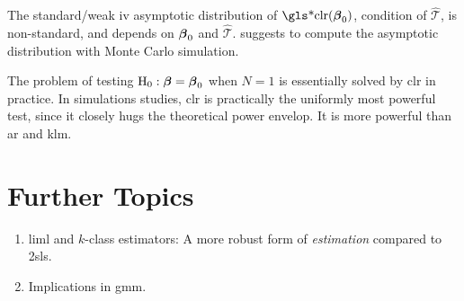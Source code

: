 \documentclass[a4paper]{article}
\begin{document}
\begin{remark}
	The standard/weak \gls*{iv} asymptotic distribution of $\text{\gls*{clr}}(\bbeta_0)$,
	condition of $\hat{\mathcal{T}}$, is non-standard,
	and depends on $\boldsymbol{\beta}_0$ and $\hat{\mathcal{T}}$.
	\textcite{moreira-2002} suggests to compute the asymptotic distribution with Monte Carlo simulation.
\end{remark}


\begin{remark}
	\parencite{stock-2008}
	The problem of testing $\mathrm{H}_0:\boldsymbol{\beta}=\boldsymbol{\beta}_0$ when $N=1$ is essentially solved by \gls*{clr} in practice.
	In simulations studies, \gls*{clr} is practically the uniformly most powerful test,
	since it closely hugs the theoretical power envelop.
	It is more powerful than \gls*{ar} and \gls*{klm}.
\end{remark}

\section{Further Topics}

\begin{enumerate}
	\item
		\gls*{liml} and $k$-class estimators: A more robust form of \emph{estimation} compared to \gls*{2sls}.
	\item
		Implications in \gls*{gmm}.
\end{enumerate}

\printglossaries
\printbibliography
\end{document}
